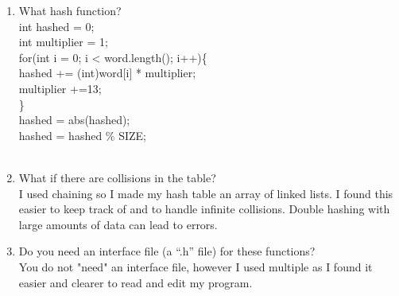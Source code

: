 \documentclass[11pt]{article} %
\begin{document}
\begin{enumerate}
\item What hash function? \\

       	int hashed = 0;\\
        int multiplier = 1;\\
        for(int i = 0; i < word.length(); i++)\{\\
            hashed += (int)word[i] * multiplier;\\
            multiplier +=13;\\
        \}\\
        hashed = abs(hashed);\\
        hashed = hashed \% SIZE;\\\\
\item  What if there are collisions in the table?\\

I used chaining so I made my hash table an array of linked lists. I found this easier to keep track of and to handle infinite collisions. Double hashing with large amounts of data can lead to errors.\\

\item  Do you need an interface file (a “.h” file) for these functions? \\

You do not "need" an interface file, however I used multiple as I found it easier and clearer to read and edit my program.\\

\end{enumerate}
\end{document}
